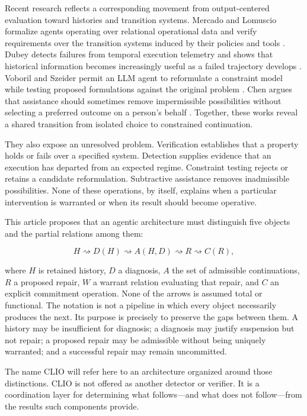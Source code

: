 \documentclass[11pt]{article}
\begin{document}
Recent research reflects a corresponding movement from output-centered evaluation toward histories and transition systems. Mercado and Lomuscio formalize agents operating over relational operational data and verify requirements over the transition systems induced by their policies and tools \cite{mercado2026}. Dubey detects failures from temporal execution telemetry and shows that historical information becomes increasingly useful as a failed trajectory develops \cite{dubey2026}. Voboril and Szeider permit an LLM agent to reformulate a constraint model while testing proposed formulations against the original problem \cite{voboril2026}. Chen argues that assistance should sometimes remove impermissible possibilities without selecting a preferred outcome on a person's behalf \cite{chen2026}. Together, these works reveal a shared transition from isolated choice to constrained continuation.

They also expose an unresolved problem. Verification establishes that a property holds or fails over a specified system. Detection supplies evidence that an execution has departed from an expected regime. Constraint testing rejects or retains a candidate reformulation. Subtractive assistance removes inadmissible possibilities. None of these operations, by itself, explains when a particular intervention is warranted or when its result should become operative.

This article proposes that an agentic architecture must distinguish five objects and the partial relations among them:

\begin{equation}
H \rightsquigarrow D(H) \rightsquigarrow A(H,D)
\rightsquigarrow R \rightsquigarrow C(R),
\end{equation}

where $H$ is retained history, $D$ a diagnosis, $A$ the set of admissible continuations, $R$ a proposed repair, $W$ a warrant relation evaluating that repair, and $C$ an explicit commitment operation. None of the arrows is assumed total or functional. The notation is not a pipeline in which every object necessarily produces the next. Its purpose is precisely to preserve the gaps between them. A history may be insufficient for diagnosis; a diagnosis may justify suspension but not repair; a proposed repair may be admissible without being uniquely warranted; and a successful repair may remain uncommitted.

The name CLIO will refer here to an architecture organized around those distinctions. CLIO is not offered as another detector or verifier. It is a coordination layer for determining what follows---and what does not follow---from the results such components provide.
\end{document}
